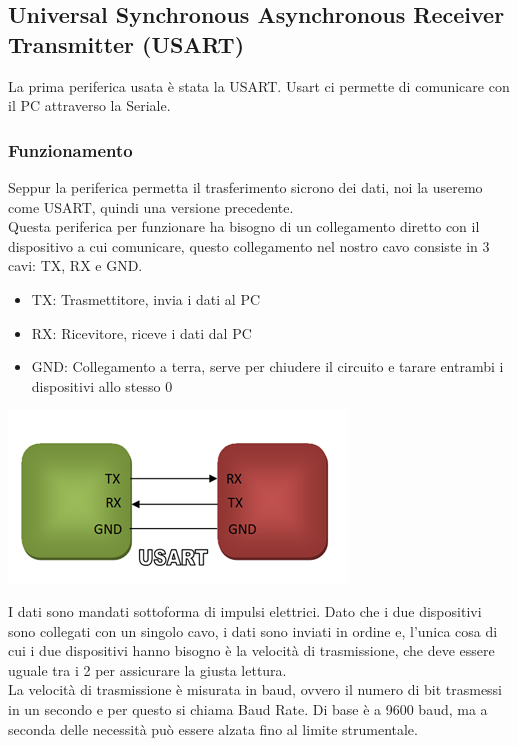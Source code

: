 \pagebreak
\subsection{Universal Synchronous Asynchronous Receiver Transmitter (USART)}
La prima periferica usata è stata la USART. Usart ci permette di comunicare con il PC attraverso la Seriale.
\\

\subsubsection{Funzionamento}
Seppur la periferica permetta il trasferimento sicrono dei dati, noi la useremo come USART, quindi una versione precedente.\\

Questa periferica per funzionare ha bisogno di un collegamento diretto con il dispositivo a cui comunicare, questo collegamento nel nostro cavo consiste in 3 cavi: TX, RX e GND.\\

\noindent
\begin{minipage}[c]{0.54\linewidth}
    \begin{itemize}
        \item TX: Trasmettitore, invia i dati al PC
        \item RX: Ricevitore, riceve i dati dal PC
        \item GND: Collegamento a terra, serve per chiudere il circuito e tarare entrambi i dispositivi allo stesso 0
    \end{itemize}
\end{minipage}
\hfill
\begin{minipage}[t]{0.4\linewidth}

    \centering
    \includegraphics[width=0.7\linewidth]{microcontrollore/assets/USART.png}
    \label{fig:USART}
\end{minipage}

I dati sono mandati sottoforma di impulsi elettrici. Dato che i due dispositivi sono collegati con un singolo cavo, i dati sono inviati in ordine e, l'unica cosa di cui i due dispositivi hanno bisogno è la velocità di trasmissione, che deve essere uguale tra i 2 per assicurare la giusta lettura.\\
La velocità di trasmissione è misurata in baud, ovvero il numero di bit trasmessi in un secondo e per questo si chiama Baud Rate. Di base è a 9600 baud, ma a seconda delle necessità può essere alzata fino al limite strumentale.\\

